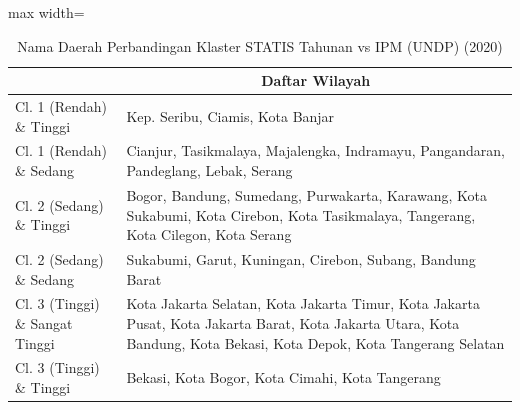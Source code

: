 \begin{table}[H]
\centering
\caption{Nama Daerah Perbandingan Klaster STATIS Tahunan vs IPM (UNDP) (2020)} \label{tab:app2statis_ipm_name_2020}
\begin{adjustbox}{max width=\textwidth}
\begin{tabular}{|>{\centering\arraybackslash}p{4cm}|p{10cm}|}
\hline
\multicolumn{1}{|c|}{\textbf{Kategori}} & \multicolumn{1}{c|}{\textbf{Daftar Wilayah}} \\
\hline
Cl. 1 (Rendah) \& Tinggi & Kep. Seribu, Ciamis, Kota Banjar \\
\hline
Cl. 1 (Rendah) \& Sedang & Cianjur, Tasikmalaya, Majalengka, Indramayu, Pangandaran, Pandeglang, Lebak, Serang \\
\hline
Cl. 2 (Sedang) \& Tinggi & Bogor, Bandung, Sumedang, Purwakarta, Karawang, Kota Sukabumi, Kota Cirebon, Kota Tasikmalaya, Tangerang, Kota Cilegon, Kota Serang \\
\hline
Cl. 2 (Sedang) \& Sedang & Sukabumi, Garut, Kuningan, Cirebon, Subang, Bandung Barat \\
\hline
Cl. 3 (Tinggi) \& Sangat Tinggi & Kota Jakarta Selatan, Kota Jakarta Timur, Kota Jakarta Pusat, Kota Jakarta Barat, Kota Jakarta Utara, Kota Bandung, Kota Bekasi, Kota Depok, Kota Tangerang Selatan \\
\hline
Cl. 3 (Tinggi) \& Tinggi & Bekasi, Kota Bogor, Kota Cimahi, Kota Tangerang \\
\hline
\end{tabular}
\end{adjustbox}
\end{table}